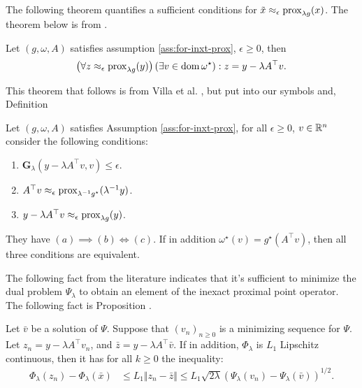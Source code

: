 \documentclass[12pt]{article}
\begin{document}
        The following theorem quantifies a sufficient conditions for $\tilde x \approx_\epsilon \operatorname{prox}_{\lambda g}(x)$. 
        The theorem below is from \cite[Proposition 2.2]{villa_accelerated_2013}. 
        \begin{theorem}\label{thm:primal-dual-trans}
            Let $(g, \omega, A)$ satisfies assumption \ref{ass:for-inxt-prox}, $\epsilon \ge 0$, then 
            \begin{align*}
                \left(
                    \forall z \approx_\epsilon \operatorname{prox}_{\lambda g}(y) 
                \right)(\exists v \in \operatorname{dom} \omega^\star): z = y - \lambda A^\top v. 
            \end{align*}
        \end{theorem}
        This theorem that follows is from Villa et al. \cite[Proposition 2.3]{villa_accelerated_2013}, but put into our symbols and, Definition 
        \begin{theorem}\label{thm:dlty-gap-inxt-pp}
            Let $(g, \omega, A)$ satisfies Assumption \ref{ass:for-inxt-prox}, for all $\epsilon \ge 0$, $v \in \mathbb R^n$ consider the following conditions: 
            \begin{enumerate}[nosep]
                \item $\mathbf G_\lambda(y - \lambda A^\top v, v) \le \epsilon$. 
                \item $A^\top v \approx_\epsilon \operatorname{prox}_{\lambda^{-1}g^\star}(\lambda^{-1}y)$. 
                \item $y - \lambda A^\top v \approx_{\epsilon} \operatorname{prox}_{\lambda g}(y)$. 
            \end{enumerate}
            They have $(a)\implies (b) \iff (c)$. 
            If in addition $\omega^\star(v) = g^\star(A^\top v)$, then all three conditions are equivalent. 
        \end{theorem}
        The following fact from the literature indicates that it's sufficient to minimize the dual problem $\Psi_\lambda$ to obtain an element of the inexact proximal point operator. 
        The following fact is Proposition \cite[Theorem 5.1]{villa_accelerated_2013}. 
        \begin{fact}
            Let $\bar v$ be a solution of $\Psi$. 
            Suppose that $(v_n)_{n \ge 0}$ is a minimizing sequence for $\Psi$. 
            Let $z_n = y - \lambda A^\top v_n$, and $\bar z = y - \lambda A^\top \bar v$. 
            If in addition, $\Phi_\lambda$ is $L_1$ Lipschitz continuous, then it has for all $k \ge 0$ the inequality: 
            \begin{align*}
                \Phi_{\lambda}(z_n) - \Phi_\lambda(\bar x) 
                &\le L_1 \Vert z_n - \bar z\Vert 
                \le L_1\sqrt{2\lambda}(\Psi_\lambda(v_n) - \Psi_\lambda(\bar v))^{1/2}. 
            \end{align*}
        \end{fact}
\end{document}
